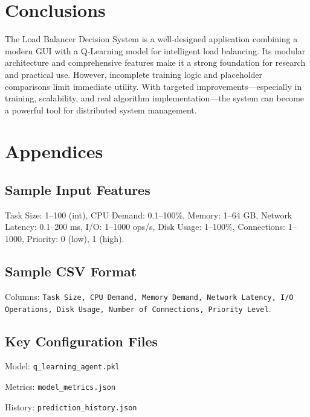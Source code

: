 \documentclass[runningheads]{llncs}
\begin{document}
\section{Conclusions}
The Load Balancer Decision System is a well-designed application combining a modern GUI with a Q-Learning model for intelligent load balancing. Its modular architecture and comprehensive features make it a strong foundation for research and practical use. However, incomplete training logic and placeholder comparisons limit immediate utility. With targeted improvements—especially in training, scalability, and real algorithm implementation—the system can become a powerful tool for distributed system management.

\section*{Appendices}
\subsection*{Sample Input Features}
Task Size: 1–100 (int), CPU Demand: 0.1–100\%, Memory: 1–64 GB, Network Latency: 0.1–200 ms, I/O: 1–1000 ops/s, Disk Usage: 1–100\%, Connections: 1–1000, Priority: 0 (low), 1 (high).

\subsection*{Sample CSV Format}
Columns: \texttt{Task Size, CPU Demand, Memory Demand, Network Latency, I/O Operations, Disk Usage, Number of Connections, Priority Level}.

\subsection*{Key Configuration Files}
\item Model: \texttt{q\_learning\_agent.pkl}
    \item Metrics: \texttt{model\_metrics.json}
    \item History: \texttt{prediction\_history.json}
\end{document}
